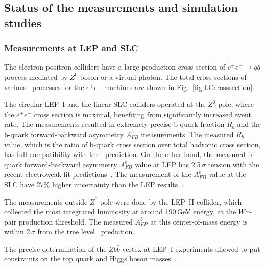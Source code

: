 %
\subsection{Status of the measurements and simulation studies}

\subsubsection{Measurements at LEP and SLC}
The electron-positron colliders have a large production cross section of $e^+e^- \to q\bar{q}$ process mediated by $Z^0$ boson or a virtual photon. The total cross sections of various \sm\ processes for the $e^+e^-$ machines are shown in Fig.~\ref{fig:LCcrosssection}.

The circular LEP~I and the linear SLC colliders operated at the $Z^0$ pole, where the $e^+e^-$ cross section is maximal, benefiting from significantly increased event rate. 
The measurements resulted in extremely precise b-quark fraction $R_b$ and the b-quark forward-backward asymmetry $A_{FB}^b$ measurements. 
The measured $R_b$ value, which is the ratio of b-quark cross section over total hadronic cross section, has full compatibility with the \sm\ prediction. 
On the other hand, the measured b-quark forward-backward asymmetry $A_{FB}^b$  value at LEP has 2.5\,$\sigma$ tension with the recent electroweak fit predictions~\cite{bib:AfbSMFit}.
The measurement of the $A_{FB}^b$ value at the SLC have 27\% higher uncertainty than the LEP results~\cite{bib:SLC}.

The measurements outside $Z^0$ pole were done by the LEP~II collider, which collected the most integrated luminosity at around 190\,GeV energy, at the $W^\pm$-pair production threshold. 
The measured $A_{FB}^b$ at this center-of-mass energy is within 2\,$\sigma$ from the tree level \sm\ prediction.

The precise determination of the $Zb\bar{b}$ vertex at LEP~I experiments allowed to put constraints on the top quark and Higgs boson masses~\cite{bib:LEPTOP}.

